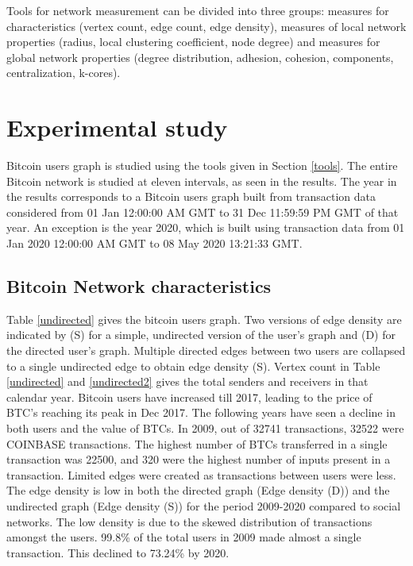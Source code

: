 \documentclass[preprint,12pt]{elsarticle}
\begin{document}
Tools for network measurement can be divided into three groups: measures for characteristics (vertex count, edge count, edge density), measures of local network properties (radius, local clustering coefficient, node degree) and measures for global network properties (degree distribution, adhesion, cohesion, components, centralization, k-cores).

\section{Experimental study} \label{expt}
Bitcoin users graph is studied using the tools given in Section \ref{tools}. The entire Bitcoin network is studied at eleven intervals, as seen in the results. The year in the results corresponds to a Bitcoin users graph built from transaction data considered from 01 Jan 12:00:00 AM GMT to 31 Dec 11:59:59 PM GMT of that year. An exception is the year 2020, which is built using transaction data from 01 Jan 2020 12:00:00 AM GMT to 08 May 2020 13:21:33 GMT.

\subsection{Bitcoin Network characteristics}
Table \ref{undirected} gives the bitcoin users graph. Two versions of edge density are indicated by (S) for a simple, undirected version of the user's graph and (D) for the directed user's graph. Multiple directed edges between two users are collapsed to a single undirected edge to obtain edge density (S). Vertex count in Table \ref{undirected} and \ref{undirected2} gives the total senders and receivers in that calendar year. Bitcoin users have increased till 2017, leading to the price of BTC's reaching its peak in Dec 2017. The following years have seen a decline in both users and the value of BTCs. In 2009, out of 32741 transactions, 32522 were COINBASE transactions. The highest number of BTCs transferred in a single transaction was 22500, and 320 were the highest number of inputs present in a transaction. Limited edges were created as transactions between users were less. The edge density is low in both the directed graph (Edge density (D)) and the undirected graph (Edge density (S)) for the period 2009-2020 compared to social networks. The low density is due to the skewed distribution of transactions amongst the users. 99.8\% of the total users in 2009 made almost a single transaction. This declined to 73.24\% by 2020.
\end{document}
